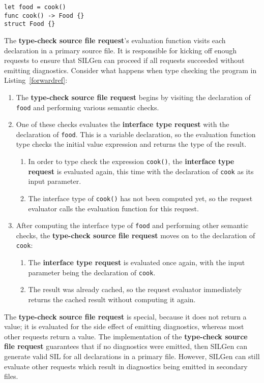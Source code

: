 \documentclass[a4paper,headsepline,bibliography=totoc,toc=flat,fleqn,twoside=semi]{scrbook}
\theoremstyle{definition}
\theoremstyle{definition}
\theoremstyle{definition}
\begin{document}
\begin{listing}\label{forwardref}
\begin{Verbatim}
let food = cook()
func cook() -> Food {}
struct Food {}
\end{Verbatim}
\end{listing}
The \textbf{type-check source file request}'s evaluation function visits each declaration in a primary source file. It is responsible for kicking off enough requests to ensure that SILGen can proceed if all requests succeeded without emitting diagnostics. Consider what happens when type checking the program in Listing~\ref{forwardref}:
\begin{enumerate}
\item The \textbf{type-check source file request} begins by visiting the declaration of \texttt{food} and performing various semantic checks.
\item One of these checks evaluates the \textbf{interface type request} with the declaration of \texttt{food}. This is a variable declaration, so the evaluation function type checks the initial value expression and returns the type of the result.
\begin{enumerate}
\item In order to type check the expression \texttt{cook()}, the \textbf{interface type request} is evaluated again, this time with the declaration of \texttt{cook} as its input parameter.
\item The interface type of \texttt{cook()} has not been computed yet, so the request evaluator calls the evaluation function for this request.
\end{enumerate}
\item After computing the interface type of \texttt{food} and performing other semantic checks, the \textbf{type-check source file request} moves on to the declaration of \texttt{cook}:
\begin{enumerate}
\item The \textbf{interface type request} is evaluated once again, with the input parameter being the declaration of \texttt{cook}.
\item The result was already cached, so the request evaluator immediately returns the cached result without computing it again.
\end{enumerate}
\end{enumerate}

The \textbf{type-check source file request} is special, because it does not return a value; it is evaluated for the side effect of emitting diagnostics, whereas most other requests return a value. The implementation of the \textbf{type-check source file request} guarantees that if no diagnostics were emitted, then SILGen can generate valid SIL for all declarations in a primary file. However, SILGen can still evaluate other requests which result in diagnostics being emitted in secondary files.
\end{document}
